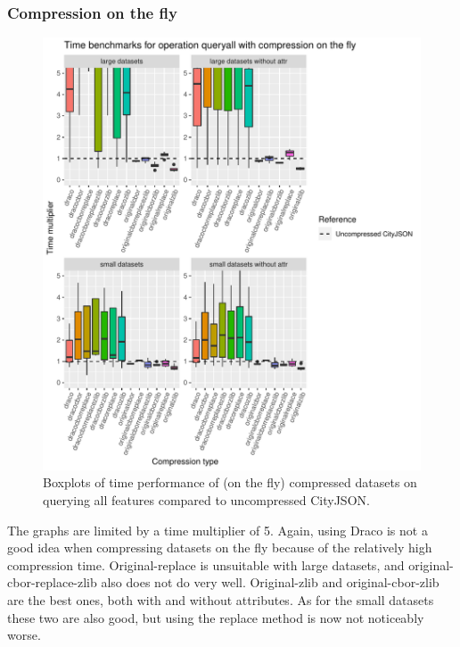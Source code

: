 \clearpage

\subsubsection{Compression on the fly}

\begin{figure}[h!]
    \includegraphics[scale=0.92]{figs/benchmark/individualotf/queryall.pdf}
    \caption{Boxplots of time performance of (on the fly) compressed datasets on querying all features compared to uncompressed CityJSON.}
    \label{figotf:sdvis}
\end{figure}

The graphs are limited by a time multiplier of 5.
Again, using Draco is not a good idea when compressing datasets on the fly because of the relatively high compression time.
Original-replace is unsuitable with large datasets, and original-cbor-replace-zlib also does not do very well.
Original-zlib and original-cbor-zlib are the best ones, both with and without attributes.
As for the small datasets these two are also good, but using the replace method is now not noticeably worse.

